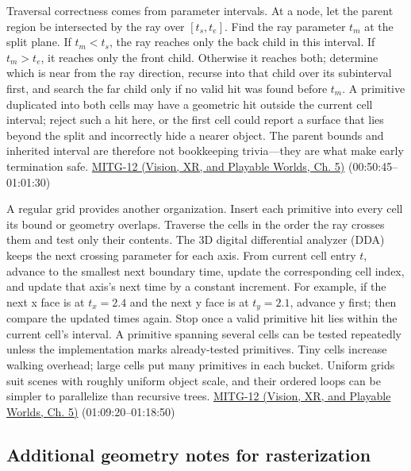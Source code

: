 Traversal correctness comes from parameter intervals. At a node, let the parent region be intersected by the ray over \([t_s,t_e]\). Find the ray parameter \(t_m\) at the split plane. If \(t_m<t_s\), the ray reaches only the back child in this interval. If \(t_m>t_e\), it reaches only the front child. Otherwise it reaches both; determine which is near from the ray direction, recurse into that child over its subinterval first, and search the far child only if no valid hit was found before \(t_m\). A primitive duplicated into both cells may have a geometric hit outside the current cell interval; reject such a hit here, or the first cell could report a surface that lies beyond the split and incorrectly hide a nearer object. The parent bounds and inherited interval are therefore not bookkeeping trivia---they are what make early termination safe. \href{../07-Vision-XR-and-Playable-Worlds/main.pdf\#nameddest=04-visual-computing-ii-ch036-mitg-12---ray-tracing-ii}{MITG-12 (Vision, XR, and Playable Worlds, Ch. 5)} (00:50:45--01:01:30)

A regular grid provides another organization. Insert each primitive into every cell its bound or geometry overlaps. Traverse the cells in the order the ray crosses them and test only their contents. The 3D digital differential analyzer (DDA) keeps the next crossing parameter for each axis. From current cell entry \(t\), advance to the smallest next boundary time, update the corresponding cell index, and update that axis's next time by a constant increment. For example, if the next x face is at \(t_x=2.4\) and the next y face is at \(t_y=2.1\), advance y first; then compare the updated times again. Stop once a valid primitive hit lies within the current cell's interval. A primitive spanning several cells can be tested repeatedly unless the implementation marks already-tested primitives. Tiny cells increase walking overhead; large cells put many primitives in each bucket. Uniform grids suit scenes with roughly uniform object scale, and their ordered loops can be simpler to parallelize than recursive trees. \href{../07-Vision-XR-and-Playable-Worlds/main.pdf\#nameddest=04-visual-computing-ii-ch036-mitg-12---ray-tracing-ii}{MITG-12 (Vision, XR, and Playable Worlds, Ch. 5)} (01:09:20--01:18:50)

\subsection{Additional geometry notes for rasterization}\label{04-visual-computing-ii-ch029-additional-geometry-notes-for-rasterization}

